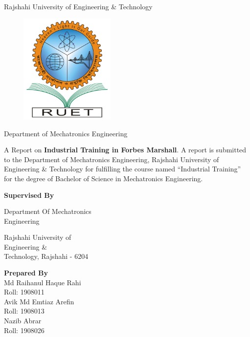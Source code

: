 \begin{center}
    Rajshahi University of Engineering \& Technology
\end{center}
\begin{figure}[h!]
    \centering
    \includegraphics[width=4.7cm]{figs/RUET.png}
    \label{fig:ruet1}
\end{figure}

\begin{center}
    Department of Mechatronics Engineering
    \end{center}
\setlength{\columnsep}{0.1\textwidth}
\noindent A Report on \textbf{Industrial Training in Forbes Marshall}. A report is submitted to the Department of Mechatronics Engineering, Rajshahi University of Engineering \& Technology for fulfilling the course named “Industrial Training” for the degree of Bachelor of Science in Mechatronics Engineering. 

\begin{center}
\begin{multicols}{2}
    \noindent \textbf{Supervised By}


    \noindent Department Of Mechatronics\\    
    Engineering

    \noindent Rajshahi University of\\
    Engineering \&\\
    Technology, Rajshahi - 6204
    \columnbreak
    
    \noindent \textbf{Prepared By}\\
    Md Raihanul Haque Rahi\\
    Roll: 1908011\\

    \noindent Avik Md Emtiaz Arefin\\
    Roll: 1908013\\

    \noindent Nazib Abrar\\
    Roll: 1908026\\


\end{multicols}
\end{center}